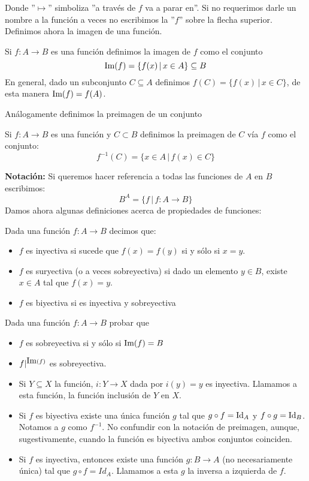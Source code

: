 \documentclass[12pt,a4paper]{book}
\begin{document}
Donde ''$\mapsto$'' simboliza ''a través de $f$ va a parar en''. Si no requerimos darle un nombre a la función a veces no escribimos la ''$f$'' sobre la flecha superior.\\[0.5cm]
Definimos ahora la imagen de una función.
\begin{defi} Si $f: A \rightarrow B$ es una función definimos la imagen de $f$ como el conjunto
$$ \mbox{Im}(f)=\{ f(x) \,\vert\, x \in A\} \subseteq B$$
En general, dado un subconjunto $C\subseteq A$ definimos $f(C) = \{ f(x) \,\vert\, x \in C\}$, de esta manera $\mbox{Im}(f) = f(A)$.
\end{defi}
Análogamente definimos la preimagen de un conjunto
\begin{defi}Si $f: A \rightarrow B$ es una función y $C \subset B$ definimos la preimagen de $C$ vía $f$ como el conjunto:
$$ f^{-1}(C) = \{  x \in A \,\vert\, f(x) \in C\}$$
\end{defi}
\textbf{Notación:} Si queremos hacer referencia a todas las funciones de $A$ en $B$ escribimos:
$$ B^A = \{ f \,\vert\, f:A \rightarrow B\}$$
Damos ahora algunas definiciones acerca de propiedades de funciones:
\begin{defi}
Dada una función $f:A \rightarrow B$ decimos que:
\begin{itemize}
\item $f$ es inyectiva si sucede que $f(x) = f(y)$ si y sólo si $x = y$.
\item $f$ es suryectiva (o a veces sobreyectiva) si dado un elemento $y \in B$, existe $x \in A$ tal que $f(x)=y$.
\item $f$ es biyectiva si es inyectiva y sobreyectiva
\end{itemize}
\end{defi}
\begin{ej} Dada una función $f:A \rightarrow B$ probar que
\begin{itemize}
\item $f$ es sobreyectiva si y sólo si $\mbox{Im}(f)=B$
\item $f\vert^{\mbox{Im}(f)}$ es sobreyectiva.
\item Si $Y\subseteq X$ la función, $i:Y \rightarrow X$ dada por $i(y)=y$ es inyectiva. Llamamos a esta función, la función inclusión de $Y$ en $X$.
\item Si $f$ es biyectiva existe una única función $g$ tal que $g \circ f = \mbox{Id}_A$ y $f \circ g = \mbox{Id}_B$. Notamos a $g$ como $f^{-1}$. No confundir con la notación de preimagen, aunque, sugestivamente, cuando la función es biyectiva ambos conjuntos coinciden.
\item Si $f$ es inyectiva, entonces existe una función $g:B \rightarrow A$ (no necesariamente única) tal que $g \circ f = Id_A$. Llamamos a esta $g$ la inversa a izquierda de $f$.
\end{itemize} 
\end{ej}
\end{document}
